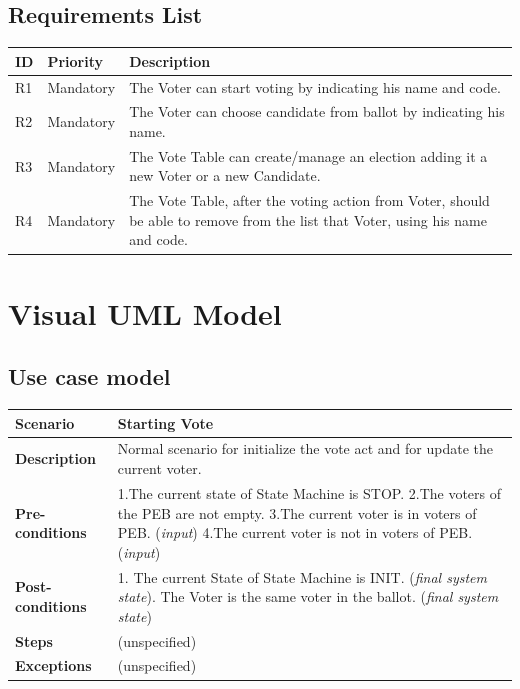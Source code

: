 \documentclass{article}
\begin{document}
\subsection{Requirements List}

\begin{center}
    \begin{tabular}{ | l | l  | p{9cm} |}
    \hline
    ID	& Priority & Description \\ \hline
    R1 &	Mandatory&	The Voter can start voting by indicating his name and code. \\ \hline
   R2& Mandatory&The Voter can choose candidate from ballot by indicating his name.\\ \hline
    R3	&Mandatory&	The Vote Table can create/manage an election adding it a new Voter or a new Candidate. \\ \hline
  R4&Mandatory&The Vote Table, after the voting action from Voter, should be able to remove from the list that Voter, using his name and code.  \\ 
    \hline
    \end{tabular}
\end{center}

\section{Visual UML Model}
\subsection{Use case model}

\begin{center}
    \begin{tabular}{ | l | p{9cm} |}
    \hline
   \textbf{Scenario}	& \textbf{Starting Vote}  \\ \hline
    \textbf{Description}	& Normal scenario for initialize the vote act and for update the current voter. \\ \hline
   \textbf{Pre-conditions}	& 1.The current state of State Machine is STOP.\linebreak
2.The voters of the PEB are not empty.\linebreak
3.The current voter is in voters of PEB. (\textit{input})\linebreak
4.The current voter is not in voters of PEB. (\textit{input})
\\ \hline
 \textbf{Post-conditions} &	1.	The current State of State Machine is INIT. (\textit{final system state})\linebreak
2.	The Voter is the same voter in the ballot. (\textit{final system state})
   \\ \hline
   \textbf{Steps} &	(unspecified) \\ 
    \hline
\textbf{Exceptions}& 	(unspecified)
 \\ 
    \hline
    \end{tabular}
\end{center}
\end{document}
